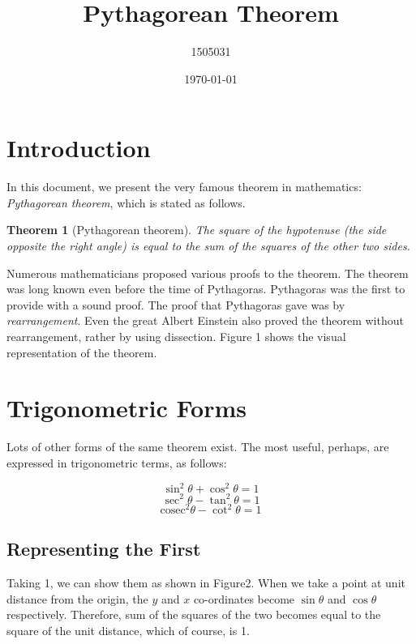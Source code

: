 \documentclass{article}
\title{Pythagorean Theorem}
\author{1505031 }
\date{\today}
\newtheorem{theorem}{Theorem}[section]
\begin{document}
\maketitle

\section{Introduction}
In this document, we present the very famous theorem in mathematics: \textit{Pythagorean theorem}, which is stated as follows.

\begin{theorem}[Pythagorean theorem]
The square of the hypotenuse (the side opposite the right angle) is equal to the sum of the squares of the other two sides.
\end{theorem}

Numerous mathematicians proposed various proofs to the theorem. The theorem was long known even before the time of Pythagoras. Pythagoras was the first to provide with a sound proof. The proof that Pythagoras gave was by \textit{rearrangement}. Even the great Albert Einstein also proved the theorem without rearrangement, rather by using dissection. Figure 1 shows the visual representation of the theorem.


\section{Trigonometric Forms}
Lots of other forms of the same theorem exist. The most useful, perhaps, are
expressed in trigonometric terms, as follows:

\begin{equation}
\sin^2\theta + \cos^2\theta = 1
\label{eqn:1}
\end{equation}
\begin{equation}
\sec^2\theta - \tan^2\theta = 1
\label{eqn:2}
\end{equation}
\begin{equation}
\mathrm{cosec^2}\theta - \cot^2\theta = 1
\label{eqn:3}
\end{equation}

\subsection{Representing the First}
Taking 1, we can show them as shown in Figure2. When we take a point at
unit distance from the origin, the $y$ and $x$ co-ordinates become $\sin\theta$ and $\cos\theta$ respectively. Therefore, sum of the squares of the two becomes equal to the
square of the unit distance, which of course, is 1. %
\end{document}
